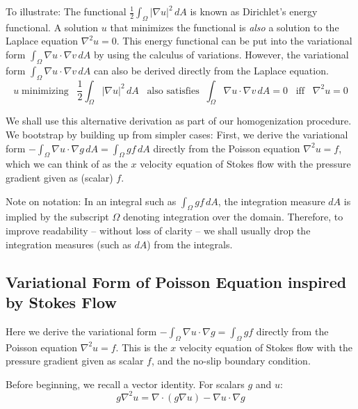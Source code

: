 \documentclass[12pt, a4paper, twoside, openright]{book}
\begin{document}
To illustrate:  The functional $ \frac{1}{2} \int_{\Omega} |\nabla u|^2 \,dA $ 
is known as Dirichlet's energy functional.  A solution $u$ that minimizes the functional is \emph{also} a solution to the Laplace equation $ \nabla^2 u = 0 $.
This energy functional can be put into the variational form $ \int_{\Omega} \nabla u \cdot \nabla v \,dA $ by using the calculus of variations.  However, the variational form $ \int_{\Omega} \nabla u \cdot \nabla v \,dA $ can also be derived directly from the Laplace equation.
\begin{equation*}
u \; \text{minimizing} \;\;\; \frac{1}{2} \int_{\Omega} |\nabla u|^2 \,dA
\;\;\; \text{also satisfies} \;\; \int_{\Omega} \nabla u \cdot \nabla v \,dA = 0
\;\;\; \text{iff} \;\;\; \nabla^2 u =0 
\end{equation*}

We shall use this alternative derivation as part of our homogenization procedure.
We bootstrap by building up from simpler cases:  First, we derive the variational form $ - \int_{\Omega} \nabla u \cdot \nabla g \,dA = \int_{\Omega} g f \,dA $ directly from the Poisson equation $ \nabla^2 u = f$, which we can think of as the $x$ velocity equation of Stokes flow with the pressure gradient given as (scalar) $f$.

Note on notation:  In an integral such as $ \int_{\Omega} g f \,dA $, the integration measure $dA$ is implied by the subscript $\Omega$ denoting integration over the domain.  Therefore, to improve readability -- without loss of clarity -- we shall usually drop the integration measures (such as $dA$) from the integrals.

\subsection{Variational Form of Poisson Equation inspired by Stokes Flow}

Here we derive the variational form $ - \int_{\Omega} \nabla u \cdot \nabla g = \int_{\Omega} g f $ directly from the Poisson equation $ \nabla^2 u = f$.  This is the $x$ velocity equation of Stokes flow with the pressure gradient given as scalar $f$, and the no-slip boundary condition.

Before beginning, we recall a vector identity.  For scalars $g$ and $u$:
\begin{equation}
g \nabla^2 u = \nabla \cdot (g \nabla u) - \nabla u \cdot \nabla g
\end{equation}
\end{document}
